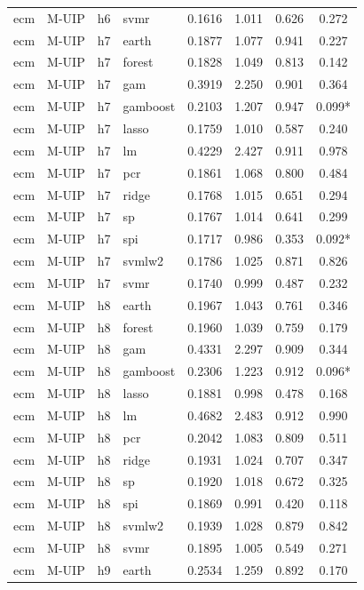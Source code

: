 \begin{ThreePartTable}
\begin{longtable}[t]{llclcccc}
ecm & M-UIP & h6 & svmr & 0.1616 & 1.011 & 0.626 & 0.272\\
\addlinespace
ecm & M-UIP & h7 & earth & 0.1877 & 1.077 & 0.941 & 0.227\\
ecm & M-UIP & h7 & forest & 0.1828 & 1.049 & 0.813 & 0.142\\
ecm & M-UIP & h7 & gam & 0.3919 & 2.250 & 0.901 & 0.364\\
ecm & M-UIP & h7 & gamboost & 0.2103 & 1.207 & 0.947 & 0.099*\\
ecm & M-UIP & h7 & lasso & 0.1759 & 1.010 & 0.587 & 0.240\\
ecm & M-UIP & h7 & lm & 0.4229 & 2.427 & 0.911 & 0.978\\
ecm & M-UIP & h7 & pcr & 0.1861 & 1.068 & 0.800 & 0.484\\
ecm & M-UIP & h7 & ridge & 0.1768 & 1.015 & 0.651 & 0.294\\
ecm & M-UIP & h7 & sp & 0.1767 & 1.014 & 0.641 & 0.299\\
ecm & M-UIP & h7 & spi & 0.1717 & 0.986 & 0.353 & 0.092*\\
ecm & M-UIP & h7 & svmlw2 & 0.1786 & 1.025 & 0.871 & 0.826\\
ecm & M-UIP & h7 & svmr & 0.1740 & 0.999 & 0.487 & 0.232\\
\addlinespace
ecm & M-UIP & h8 & earth & 0.1967 & 1.043 & 0.761 & 0.346\\
ecm & M-UIP & h8 & forest & 0.1960 & 1.039 & 0.759 & 0.179\\
ecm & M-UIP & h8 & gam & 0.4331 & 2.297 & 0.909 & 0.344\\
ecm & M-UIP & h8 & gamboost & 0.2306 & 1.223 & 0.912 & 0.096*\\
ecm & M-UIP & h8 & lasso & 0.1881 & 0.998 & 0.478 & 0.168\\
ecm & M-UIP & h8 & lm & 0.4682 & 2.483 & 0.912 & 0.990\\
ecm & M-UIP & h8 & pcr & 0.2042 & 1.083 & 0.809 & 0.511\\
ecm & M-UIP & h8 & ridge & 0.1931 & 1.024 & 0.707 & 0.347\\
ecm & M-UIP & h8 & sp & 0.1920 & 1.018 & 0.672 & 0.325\\
ecm & M-UIP & h8 & spi & 0.1869 & 0.991 & 0.420 & 0.118\\
ecm & M-UIP & h8 & svmlw2 & 0.1939 & 1.028 & 0.879 & 0.842\\
ecm & M-UIP & h8 & svmr & 0.1895 & 1.005 & 0.549 & 0.271\\
\addlinespace
ecm & M-UIP & h9 & earth & 0.2534 & 1.259 & 0.892 & 0.170\\

\end{longtable}
\end{ThreePartTable}
